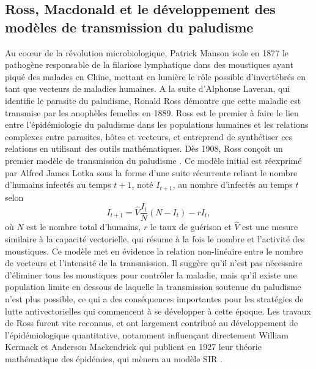\subsection{Ross, Macdonald et le développement des modèles de transmission du paludisme}

Au co\oe ur de la révolution microbiologique, Patrick Manson isole en 1877 le pathogène responsable de la filariose lymphatique dans des moustiques ayant piqué des malades en Chine, mettant en lumière le rôle possible d'invertébrés en tant que vecteurs de maladies humaines. 
A la suite d'Alphonse Laveran, qui identifie le parasite du paludisme, Ronald Ross démontre que cette maladie est transmise par les anophèles femelles en 1889. 
Ross est le premier à faire le lien entre l'épidémiologie du paludisme dans les populations humaines et les relations complexes entre parasites, hôtes et vecteurs, et entreprend de synthétiser ces relations en utilisant des outils mathématiques.
Dès 1908, Ross conçoit un premier modèle de transmission du paludisme \cite{ross1908report}.
Ce modèle initial est réexprimé par Alfred James Lotka sous la forme d'une suite récurrente reliant le nombre d'humains infectés au temps $t+1$, noté $I_{t+1}$, au nombre d'infectés au temps $t$ selon
\begin{equation}
I_{t+1} = \hat{V}\frac{I_t}{N}(N-I_t)-rI_t,
\end{equation}
où $N$ est le nombre total d'humains, $r$ le taux de guérison et $\hat{V}$ est une mesure similaire à la capacité vectorielle, qui résume à la fois le nombre et l'activité des moustiques. 
Ce modèle met en évidence la relation non-linéaire entre le nombre de vecteurs et l'intensité de la transmission. 
Il suggère qu'il n'est pas nécessaire d'éliminer tous les moustiques pour contrôler la maladie, mais qu'il existe une population limite en dessous de laquelle la transmission soutenue du paludisme n'est plus possible, ce qui a des conséquences importantes pour les stratégies de lutte antivectorielles qui commencent à se développer à cette époque.
Les travaux de Ross furent vite reconnus, et ont largement contribué au développement de l'épidémiologique quantitative, notamment influençant directement William Kermack et Anderson Mackendrick qui publient en 1927 leur théorie mathématique des épidémies, qui mènera au modèle SIR \cite{kermack1927contributions}.

